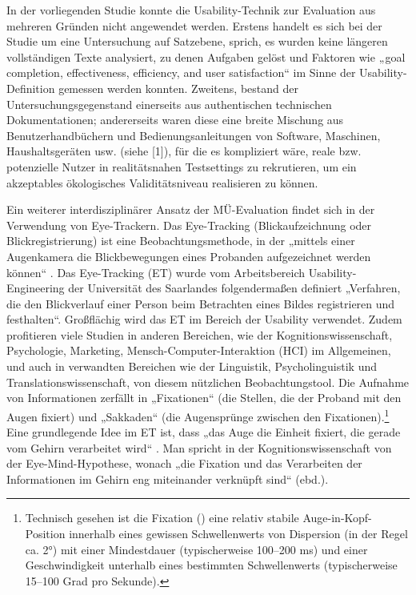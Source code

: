 In der vorliegenden Studie konnte die Usability-Technik zur Evaluation aus mehreren Gründen nicht angewendet werden. Erstens handelt es sich bei der Studie um eine Untersuchung auf Satzebene, sprich, es wurden keine längeren vollständigen Texte analysiert, zu denen Aufgaben gelöst und Faktoren wie „goal completion, effectiveness, efficiency, and user satisfaction“ im Sinne der Usability-Definition gemessen werden konnten. Zweitens, bestand der Untersuchungsgegenstand einerseits aus authentischen technischen Dokumentationen; andererseits waren diese eine breite Mischung aus Benutzerhandbüchern und Bedienungsanleitungen von Software, Maschinen, Haushaltsgeräten usw. (siehe  [1]), für die es kompliziert wäre, reale bzw. potenzielle Nutzer in realitätsnahen Testsettings zu rekrutieren, um ein akzeptables ökologisches Validitätsniveau realisieren zu können.


Ein weiterer interdisziplinärer Ansatz der MÜ-Evaluation findet sich in der Verwendung von Eye-Trackern. Das Eye-Tracking (Blickaufzeichnung oder Blickregistrierung) ist eine Beobachtungsmethode, in der „mittels einer Augenkamera die Blickbewegungen eines Probanden aufgezeichnet werden können“ \citep[80]{Stoessel2002}. Das Eye-Tracking (ET) wurde vom Arbeitsbereich Usability-Engi\-nee\-ring der Universität des Saarlandes \citep{ABUEUS2006} folgendermaßen definiert „Verfahren, die den Blickverlauf einer Person beim Betrachten eines Bildes registrieren und festhalten“. Großflächig wird das ET im Bereich der Usability verwendet. Zudem profitieren viele Studien in anderen Bereichen, wie der Kognitionswissenschaft, Psychologie, Marketing, Mensch-Computer-In\-ter\-ak\-tion (HCI) im Allgemeinen, und auch in verwandten Bereichen wie der Linguistik, Psycholinguistik und Translationswissenschaft, von diesem nützlichen Beobachtungstool. Die Aufnahme von Informationen zerfällt in „Fixationen“ (die Stellen, die der Proband mit den Augen fixiert) und „Sakkaden“ (die Augensprünge zwischen den Fixationen).\footnote{\textrm{Technisch gesehen ist die Fixation (\citealt{JacobKarn2003}) eine relativ stabile Auge-in-Kopf-Position innerhalb eines gewissen Schwellenwerts von Dispersion (in der Regel ca. 2°) mit einer Mindestdauer (typischerweise 100--200 ms) und einer Geschwindigkeit unterhalb eines bestimmten Schwellenwerts (typischerweise 15--100 Grad pro Sekunde).}} Eine grundlegende Idee im ET ist, dass „das Auge die Einheit fixiert, die gerade vom Gehirn verarbeitet wird“ \citep{Funke2006}. Man spricht in der Kognitionswissenschaft von der Eye-Mind-Hypothese, wonach „die Fixation und das Verarbeiten der Informationen im Gehirn eng miteinander verknüpft sind“ (ebd.).

